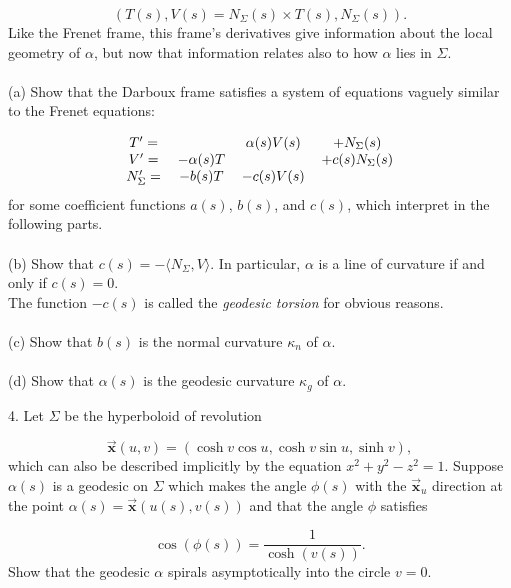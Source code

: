 \documentclass[11pt,letterpaper]{article}
\begin{document}
\[(T(s),V(s)=N_{\Sigma}(s)\times T(s),N_{\Sigma}(s)).
\]
Like the Frenet frame, this frame's derivatives give information about the local geometry of $\alpha$, but now that information relates also to how $\alpha$ lies in $\Sigma$.
\\
\\
(a) Show that the Darboux frame satisfies a system of equations vaguely similar to the Frenet equations:

\[\begin{tabular}{cccc}
$T'=$ & & $\alpha(s)V(s)$&$+N_{\Sigma}(s)$\\
$V'=$ & $-\alpha(s)T$ & & $+c(s)N_{\Sigma}(s)$\\
$N_{\Sigma}'=$ & $-b(s)T$ & $-c(s)V(s)$ &
\end{tabular}
\]
for some coefficient functions $a(s)$, $b(s)$, and $c(s)$, which interpret in the following parts.
\\
\\

(b) Show that $c(s)=-\langle N_{\Sigma},V\rangle$.  In particular, $\alpha$ is a line of curvature if and only if $c(s)=0$.\\
The function $-c(s)$ is called the \textit{geodesic torsion} for obvious reasons.
\\
\\

(c) Show that $b(s)$ is the normal curvature $\kappa_n$ of $\alpha$.
\\
\\

(d) Show that $\alpha(s)$ is the geodesic curvature $\kappa_g$ of $\alpha$.
\\
\pagebreak




4. Let $\Sigma$ be the hyperboloid of revolution

\[\vec{\mathbf{x}}(u,v)=(\cosh{v}\cos{u},\cosh{v}\sin{u},\sinh{v}),
\]
which can also be described implicitly by the equation $x^2+y^2-z^2=1$.  Suppose $\alpha(s)$ is a geodesic on $\Sigma$ which makes the angle $\phi(s)$ with the $\vec{\mathbf{x}}_u$ direction at the point $\alpha(s)=\vec{\mathbf{x}}(u(s),v(s))$ and that the angle $\phi$ satisfies

\[\cos{(\phi(s))}=\frac{1}{\cosh{(v(s))}}.
\]
Show that the geodesic $\alpha$ spirals asymptotically into the circle $v=0$.

\pagebreak
\end{document}
